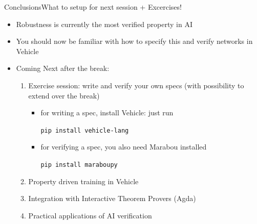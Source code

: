 \documentclass[t,compress,aspectratio=169]{beamer}
\begin{document}
\begin{frame}{Conclusions}{What to setup for next session + Excercises!}
	\begin{itemize}
		\item Robustness is currently the most verified property in AI
        \item You should now be familiar with how to specify this and verify networks in Vehicle
        \item Coming Next after the break:
        \begin{enumerate}
            \item \textcolor{aisecred}{Exercise session:} write and verify your own specs (with possibility to extend over the break)

            \begin{itemize}
            \item for writing a spec, install Vehicle: just run 
            
            \texttt{pip install vehicle-lang}
            
            \item for verifying a spec, you also need Marabou installed 
            
            \texttt{pip install maraboupy}
            \end{itemize}
            \item Property driven training in Vehicle
            \item Integration with Interactive Theorem Provers (Agda)
            \item Practical applications of AI verification
        \end{enumerate}

	\end{itemize}

\vspace{1em}

\end{frame}
\end{document}
